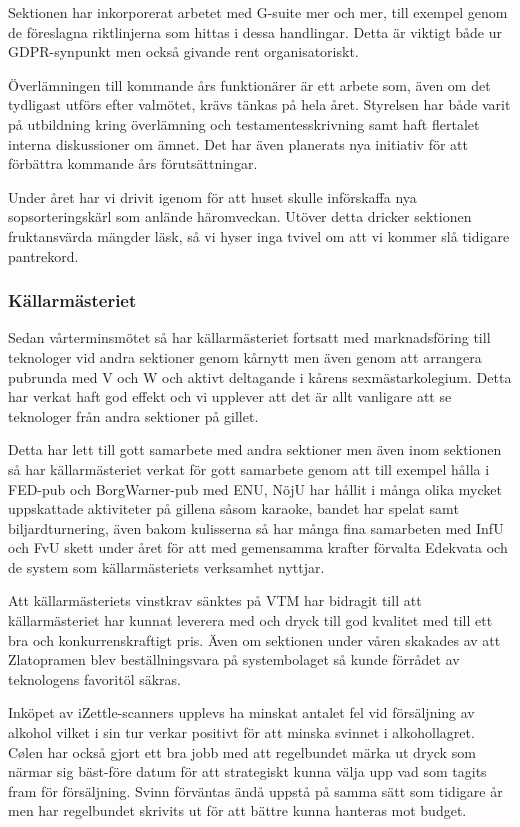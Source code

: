 \documentclass[../_main/handlingar.tex]{subfiles}
\begin{document}
Sektionen har inkorporerat arbetet med G-suite mer och mer, till exempel genom de föreslagna riktlinjerna som hittas i dessa handlingar. Detta är viktigt både ur GDPR-synpunkt men också givande rent organisatoriskt. 

Överlämningen till kommande års funktionärer är ett arbete som, även om det tydligast utförs efter valmötet, krävs tänkas på hela året. Styrelsen har både varit på utbildning kring överlämning och testamentesskrivning samt haft flertalet interna diskussioner om ämnet. Det har även planerats nya initiativ för att förbättra kommande års förutsättningar. 

Under året har vi drivit igenom för att huset skulle införskaffa nya sopsorteringskärl som anlände häromveckan. Utöver detta dricker sektionen fruktansvärda mängder läsk, så vi hyser inga tvivel om att vi kommer slå tidigare pantrekord.  

\newpage

\subsubsection*{Källarmästeriet}

Sedan vårterminsmötet så har källarmästeriet fortsatt med marknadsföring till teknologer vid andra sektioner genom kårnytt men även genom att arrangera pubrunda med V och W och aktivt deltagande i kårens sexmästarkolegium. Detta har verkat haft god effekt och vi upplever att det är allt vanligare att se teknologer från andra sektioner på gillet. 

Detta har lett till gott samarbete med andra sektioner men även inom sektionen så har källarmästeriet verkat för gott samarbete genom att till exempel hålla i FED-pub och BorgWarner-pub med ENU, NöjU har hållit i många olika mycket uppskattade aktiviteter på gillena såsom karaoke, bandet har spelat samt biljardturnering, även bakom kulisserna så har många fina samarbeten med InfU och FvU skett under året för att med gemensamma krafter förvalta Edekvata och de system som källarmästeriets verksamhet nyttjar. 

Att källarmästeriets vinstkrav sänktes på VTM har bidragit till att källarmästeriet har kunnat leverera med och dryck till god kvalitet med till ett bra och konkurrenskraftigt pris. Även om sektionen under våren skakades av att Zlatopramen blev beställningsvara på systembolaget så kunde förrådet av teknologens favoritöl säkras. 

Inköpet av iZettle-scanners upplevs ha minskat antalet fel vid försäljning av alkohol vilket i sin tur verkar positivt för att minska svinnet i alkohollagret. Cølen har också gjort ett bra jobb med att regelbundet märka ut dryck som närmar sig bäst-före datum för att strategiskt kunna välja upp vad som tagits fram för försäljning. Svinn förväntas ändå uppstå på samma sätt som tidigare år men har regelbundet skrivits ut för att bättre kunna hanteras mot budget. 
\end{document}
